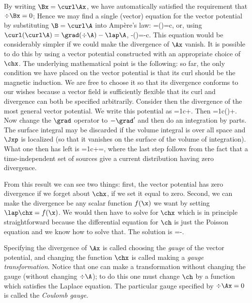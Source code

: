 {By writing $\Bx=\curl\Ax$, we have automatically satisfied the requirement
that $\div\Bx=0$; Hence we may find a single (vector) equation for the vector
potential by substituting $\B=\curl\A$ into Amp\`ere's law:
\beq
\curl\Bx=\curl(\curl\Ax)=\frac{4\pi}c\Jx,
\eeq
or, using $\curl(\curl\A)=\grad(\div\A)-\lap\A$,
\beq
\lap\Ax-\grad(\div\Ax)=-\frac{4\pi}c\Jx.
\eeq
This equation would be considerably simpler if we could make the divergence
of $\Ax$ vanish. It is possible to do this by using a vector potential
constructed with an appropriate choice of $\chx$. The underlying
mathematical point is the following: so far, the only condition we have
placed on the vector potential is that its curl should be the magnetic
induction. We are free to choose it so that its divergence conforms to our
wishes because a vector field is sufficiently flexible that its curl and
divergence can both be specified arbitrarily. Consider then the divergence of
the most general vector potential. We write this potential as
\beq
\Ax=\frac1c\inivp\frac{\J(\xp)}\xxpa+\grad\chx.
\eeq
Then
\beq
\div\Ax=\frac1c\inivp\J(\xp)\cdot\grad\lep\xxpi\rip+\lap\chx.
\eeq
Now change the $\grad$ operator to $-\grad'$ and then do an integration by
parts. The surface integral may be discarded if the volume integral is over
all space and $\Jxp$ is localized (so that it vanishes on the surface of
the volume of integration). What one then has left is
\beq
\div\Ax=\frac1c\inivp\frac{\divp\J(\xp)}\xxpa+\lap\chx=\lap\chx,
\eeq
where the last step follows from the fact that a time-independent set of
sources give a current distribution having zero divergence.

From this result we can see two things: first, the
vector potential has zero divergence if we forget about $\chx$, \ie if we
set it equal to zero. Second, we can make the divergence be any
scalar function $f(\x)$ we want by setting $\lap\chx=f(\x)$. We would then
have to solve for $\chx$ which is in principle straightforward because the
differential equation for $\ch$ is just the Poisson equation and we know
how to solve that. The solution is
\beq
\chx=-\inivp{}\xxpa.
\eeq

Specifying the divergence of $\Ax$ is called choosing the {\em gauge} of
the vector potential, and changing the function $\chx$ is called making a
{\em gauge transformation}. Notice that one can make a transformation
without changing the gauge (\ie without changing $\div\A$); to do this one
must change $\ch$ by a function which satisfies the Laplace equation. The
particular gauge specified by $\div\Ax=0$ is called the
{\em Coulomb gauge}.

}
